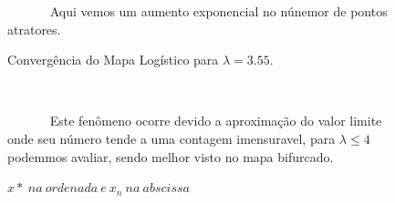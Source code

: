 \documentclass[pdftex,12pt,a4paper]{article}
\begin{document}
\begin{figure}
~~~~~~ Aqui vemos um aumento exponencial no núnemor de pontos atratores. 
\centering
\caption{Convergência do Mapa Logístico para $\lambda = 3.55$.}
\caption*{$x*\ na\ ordenada\ e\ x_{n}\ na\ abscissa$ }\ 

~~~~~~ Este fenômeno ocorre devido a aproximação do valor limite onde seu número tende a uma contagem imensuravel, para $\lambda \leq 4$ podemmos avaliar, sendo melhor visto no mapa bifurcado.
\end{figure}
\end{document}
